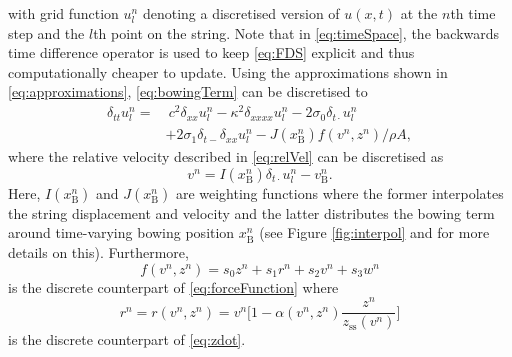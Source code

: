 \documentclass[twoside,a4paper,dvipsnames]{article}
\begin{document}
with grid function $u_l^n$ denoting a discretised version of $u(x,t)$ at the $n$th time step and the $l$th point on the string. Note that in \eqref{eq:timeSpace}, the backwards time difference operator is used to keep \eqref{eq:FDS} explicit and thus computationally cheaper to update. Using the approximations shown in \eqref{eq:approximations}, \eqref{eq:bowingTerm} can be discretised to
\begin{equation}
  \begin{aligned}
    \label{eq:FDS}
        \delta_{tt} u_l^n = &\: c^2 \delta_{xx} u_l^n -\kappa^2\delta_{xxxx} u_l^n - 2\sigma_0\delta_{t\cdot} u_l^n
        \\ 
        &+ 2\sigma_1\delta_{t-}\delta_{xx}u_l^n - J(x_\text{B}^n)f(v^n, z^n) / \rho A,
    \end{aligned}
\end{equation}
where the relative velocity described in \eqref{eq:relVel} can be discretised as
\begin{equation}\label{eq:discRelVel}
v^n = I(x_\text{B}^n)\delta_{t\cdot}u_l^n -  v_\text{B}^n.
\end{equation}
    Here, $I(x_\text{B}^n)$ and $J(x_\text{B}^n)$ are weighting functions where the former interpolates the string displacement and velocity and the latter distributes the bowing term around time-varying bowing position $x_\text{B}^n$ (see Figure \ref{fig:interpol} and \cite{Bilbao2009}
for more details on this). Furthermore,
\begin{equation}\label{eq:discForceFunction}
    f(v^n,z^n) = s_0z^n + s_1r^n+s_2v^n+s_3w^n
\end{equation} 
is the discrete counterpart of \eqref{eq:forceFunction} where 
\begin{equation}\label{eq:r}
    r^n = r(v^n,z^n) = v^n\bigg[1-\alpha(v^n,z^n)\frac{z^n}{z_\text{ss}(v^n)}\bigg]
\end{equation}
is the discrete counterpart of \eqref{eq:zdot}.
\end{document}
